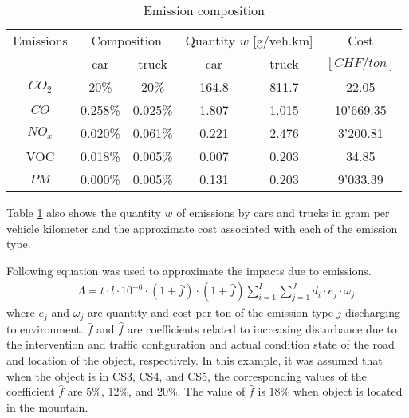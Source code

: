 \documentclass[a4paper,3p,times,authoryear]{elsarticle}
\begin{document}
\begin{table}[H]
\centering
\caption{Emission composition} \label{tbl:emission}
\begin{tabular}{|l|l|l|l|l|l|}
\hline
\multicolumn{1}{|c|}{Emissions} & \multicolumn{2}{c|}{Composition} & \multicolumn{2}{c|}{Quantity $w$ [g/veh.km]} & \multicolumn{1}{c|}{Cost} \\ 
\cline{2-5}
\multicolumn{1}{|c|}{} & \multicolumn{1}{c|}{car} & \multicolumn{1}{c|}{truck} & \multicolumn{1}{c|}{car} & \multicolumn{1}{c|}{truck} & \multicolumn{1}{c|}{$[CHF/ton]$} \\ 
\hline
\multicolumn{1}{|c|}{$CO_2$} & \multicolumn{1}{c|}{20\%} & \multicolumn{1}{c|}{20\%} & \multicolumn{1}{c|}{164.8} & \multicolumn{1}{c|}{811.7} & \multicolumn{1}{c|}{22.05} \\ 
\hline
\multicolumn{1}{|c|}{$CO$} & \multicolumn{1}{c|}{0.258\%} & \multicolumn{1}{c|}{0.025\%} & \multicolumn{1}{c|}{1.807} & \multicolumn{1}{c|}{1.015} & \multicolumn{1}{c|}{10'669.35} \\ 
\hline
\multicolumn{1}{|c|}{$NO_x$} & \multicolumn{1}{c|}{0.020\%} & \multicolumn{1}{c|}{0.061\%} & \multicolumn{1}{c|}{0.221} & \multicolumn{1}{c|}{2.476} & \multicolumn{1}{c|}{3'200.81} \\ 
\hline
\multicolumn{1}{|c|}{VOC} & \multicolumn{1}{c|}{0.018\%} & \multicolumn{1}{c|}{0.005\%} & \multicolumn{1}{c|}{0.007} & \multicolumn{1}{c|}{0.203} & \multicolumn{1}{c|}{34.85} \\ 
\hline
\multicolumn{1}{|c|}{$PM$} & \multicolumn{1}{c|}{0.000\%} & \multicolumn{1}{c|}{0.005\%} & \multicolumn{1}{c|}{0.131} & \multicolumn{1}{c|}{0.203} & \multicolumn{1}{c|}{9'033.39} \\ 
\hline
\end{tabular}
\end{table}

Table \ref{tbl:emission} also shows the quantity $w$ of emissions by cars and trucks in gram per vehicle kilometer and the approximate cost associated with each of the emission type. 

Following equation was used to approximate the impacts due to emissions.
\begin{eqnarray}
      && \Lambda= t \cdot l \cdot 10^{-6} \cdot (1+\bar f) \cdot (1+\hat f)\sum_{i=1}^{I} \sum_{j=1}^J d_i \cdot e_j \cdot \omega_j \label{emissionimpact} 
\end{eqnarray}
where $e_j$ and $\omega_j$ are quantity and cost per ton of the emission type $j$ discharging to environment. $\bar f$ and $\hat f$ are coefficients related to increasing disturbance due to the intervention and traffic configuration and actual condition state of the road and location of the object, respectively. In this example, it was assumed that when the object is in CS3, CS4, and CS5, the corresponding values of the coefficient $\hat f$ are 5\%, 12\%, and 20\%. The value of $\hat f$ is 18\% when object is located in the mountain.
\end{document}
